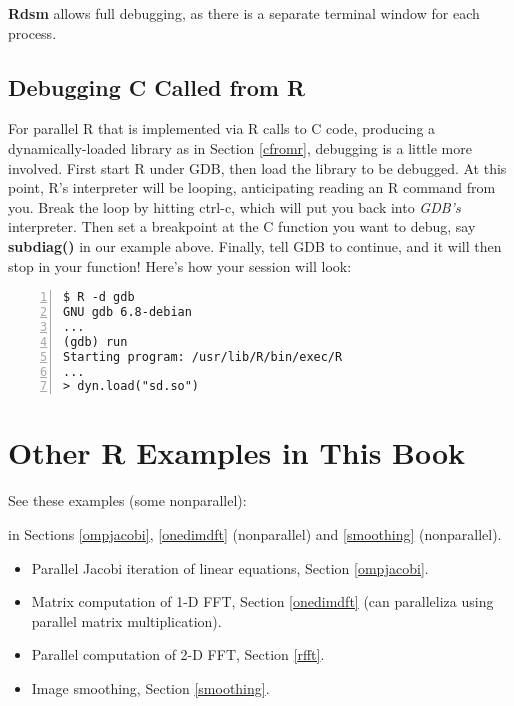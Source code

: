 {\bf Rdsm} allows full debugging, as there is a separate terminal window
for each process.

\subsection{Debugging C Called from R}

For parallel R that is implemented via R calls to C code, producing a
dynamically-loaded library as in Section \ref{cfromr}, debugging is a
little more involved.  First start R under GDB, then load the library to
be debugged.  At this point, R's interpreter will be looping,
anticipating reading an R command from you.  Break the loop by hitting
ctrl-c, which will put you back into {\it GDB's} interpreter.  Then set
a breakpoint at the C function you want to debug, say {\bf subdiag()} in
our example above.  Finally, tell GDB to continue, and it will then stop
in your function!  Here's how your session will look:

\begin{lstlisting}[numbers=left]
$ R -d gdb
GNU gdb 6.8-debian
...
(gdb) run
Starting program: /usr/lib/R/bin/exec/R
...
> dyn.load("sd.so")
\end{lstlisting}

\section{Other R Examples in This Book}

See these examples (some nonparallel):

in Sections \ref{ompjacobi}, \ref{onedimdft} (nonparallel)
and \ref{smoothing} (nonparallel).

\begin{itemize}

\item Parallel Jacobi iteration of linear equations, Section \ref{ompjacobi}.

\item Matrix computation of 1-D FFT, Section \ref{onedimdft} (can
paralleliza using parallel matrix multiplication).

\item Parallel computation of 2-D FFT, Section \ref{rfft}.

\item Image smoothing, Section \ref{smoothing}.

\end{itemize}



